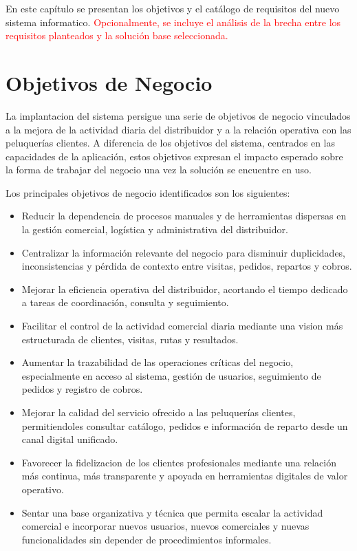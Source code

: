 
En este capítulo se presentan los objetivos y el catálogo de requisitos del nuevo sistema informatico. \textcolor{red}{Opcionalmente, se incluye el análisis de la brecha entre los requisitos planteados y la solución base seleccionada.}

\section{Objetivos de Negocio}
La implantacion del sistema persigue una serie de objetivos de negocio vinculados a la mejora de la actividad diaria del distribuidor y a la relación operativa con las peluquerías clientes. A diferencia de los objetivos del sistema, centrados en las capacidades de la aplicación, estos objetivos expresan el impacto esperado sobre la forma de trabajar del negocio una vez la solución se encuentre en uso.

Los principales objetivos de negocio identificados son los siguientes:

\begin{itemize}
    \item Reducir la dependencia de procesos manuales y de herramientas dispersas en la gestión comercial, logística y administrativa del distribuidor.
    \item Centralizar la información relevante del negocio para disminuir duplicidades, inconsistencias y pérdida de contexto entre visitas, pedidos, repartos y cobros.
    \item Mejorar la eficiencia operativa del distribuidor, acortando el tiempo dedicado a tareas de coordinación, consulta y seguimiento.
    \item Facilitar el control de la actividad comercial diaria mediante una vision más estructurada de clientes, visitas, rutas y resultados.
    \item Aumentar la trazabilidad de las operaciones críticas del negocio, especialmente en acceso al sistema, gestión de usuarios, seguimiento de pedidos y registro de cobros.
    \item Mejorar la calidad del servicio ofrecido a las peluquerías clientes, permitiendoles consultar catálogo, pedidos e información de reparto desde un canal digital unificado.
    \item Favorecer la fidelizacion de los clientes profesionales mediante una relación más continua, más transparente y apoyada en herramientas digitales de valor operativo.
    \item Sentar una base organizativa y técnica que permita escalar la actividad comercial e incorporar nuevos usuarios, nuevos comerciales y nuevas funcionalidades sin depender de procedimientos informales.
\end{itemize}

